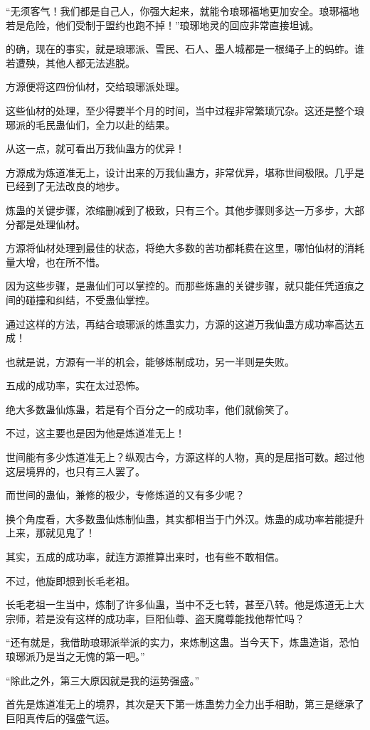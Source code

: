 \begin{this_body}
“无须客气！我们都是自己人，你强大起来，就能令琅琊福地更加安全。琅琊福地若是危险，他们受制于盟约也跑不掉！”琅琊地灵的回应非常直接坦诚。

的确，现在的事实，就是琅琊派、雪民、石人、墨人城都是一根绳子上的蚂蚱。谁若遭殃，其他人都无法逃脱。

方源便将这四份仙材，交给琅琊派处理。

这些仙材的处理，至少得要半个月的时间，当中过程非常繁琐冗杂。这还是整个琅琊派的毛民蛊仙们，全力以赴的结果。

从这一点，就可看出万我仙蛊方的优异！

方源成为炼道准无上，设计出来的万我仙蛊方，非常优异，堪称世间极限。几乎是已经到了无法改良的地步。

炼蛊的关键步骤，浓缩删减到了极致，只有三个。其他步骤则多达一万多步，大部分都是处理仙材。

方源将仙材处理到最佳的状态，将绝大多数的苦功都耗费在这里，哪怕仙材的消耗量大增，也在所不惜。

因为这些步骤，是蛊仙们可以掌控的。而那些炼蛊的关键步骤，就只能任凭道痕之间的碰撞和纠结，不受蛊仙掌控。

通过这样的方法，再结合琅琊派的炼蛊实力，方源的这道万我仙蛊方成功率高达五成！

也就是说，方源有一半的机会，能够炼制成功，另一半则是失败。

五成的成功率，实在太过恐怖。

绝大多数蛊仙炼蛊，若是有个百分之一的成功率，他们就偷笑了。

不过，这主要也是因为他是炼道准无上！

世间能有多少炼道准无上？纵观古今，方源这样的人物，真的是屈指可数。超过他这层境界的，也只有三人罢了。

而世间的蛊仙，兼修的极少，专修炼道的又有多少呢？

换个角度看，大多数蛊仙炼制仙蛊，其实都相当于门外汉。炼蛊的成功率若能提升上来，那就见鬼了！

其实，五成的成功率，就连方源推算出来时，也有些不敢相信。

不过，他旋即想到长毛老祖。

长毛老祖一生当中，炼制了许多仙蛊，当中不乏七转，甚至八转。他是炼道无上大宗师，若是没有这样的成功率，巨阳仙尊、盗天魔尊能找他帮忙吗？

“还有就是，我借助琅琊派举派的实力，来炼制这蛊。当今天下，炼蛊造诣，恐怕琅琊派乃是当之无愧的第一吧。”

“除此之外，第三大原因就是我的运势强盛。”

首先是炼道准无上的境界，其次是天下第一炼蛊势力全力出手相助，第三是继承了巨阳真传后的强盛气运。


\end{this_body}
